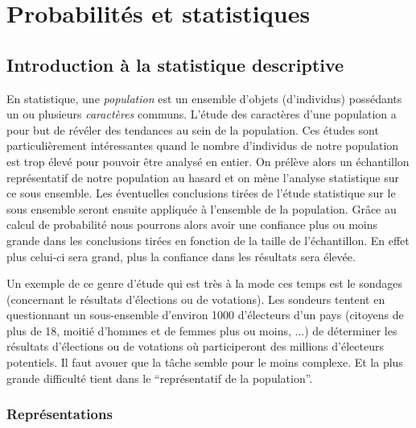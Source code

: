 \documentclass[a4paper,12pt]{book}
\begin{document}
\chapter{Probabilités et statistiques}

\section{Introduction à la statistique descriptive}

En statistique, une \textit{population} est un ensemble d'objets (d'individus) possédants un ou plusieurs \textit{caractères} communs.
L'étude des caractères d'une population a pour but de révéler des tendances au sein de la population. Ces études sont particulièrement
intéressantes quand le nombre d'individus de notre population est trop élevé pour pouvoir être analysé en entier. On prélève alors un échantillon 
représentatif de notre population au hasard 
et on mène l'analyse statistique sur ce sous ensemble. Les éventuelles conclusions tirées de l'étude statistique sur le sous ensemble seront ensuite appliquée
à l'ensemble de la population. Grâce au calcul de probabilité nous pourrons alors avoir une confiance plus ou moins grande dans les conclusions 
tirées en fonction de la taille de l'échantillon. En effet plus celui-ci sera grand, plus la confiance dans les résultats sera élevée.

Un exemple de ce genre d'étude qui est très à la mode ces temps est le sondages (concernant le résultats d'élections ou de votations). 
Les sondeurs tentent en questionnant un sous-ensemble 
d'environ 1000 d'électeurs d'un pays (citoyens de plus de 18, moitié d'hommes et de femmes plus ou moins, ...) de déterminer 
les résultats d'élections ou de votations où participeront des millions d'électeurs potentiels. Il faut avouer que la tâche semble pour 
le moins complexe. Et la plus grande difficulté tient dans le ``représentatif de la population''.

\subsection{Représentations}
\end{document}
